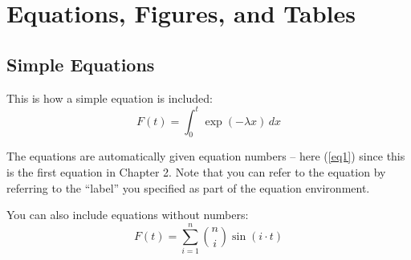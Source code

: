 \chapter[Equations, etc]{Equations, Figures, and Tables}

\section{Simple Equations}
This is how a simple equation is included:
\begin{equation}
F(t)=\int_0^t \exp(-\lambda x)\,dx
\label{eq1}
\end{equation}

The equations are automatically given equation numbers -- here (\ref{eq1}) since this is the first equation in Chapter 2. Note that you can refer to the equation by referring to the ``label'' you specified as part of the equation environment.

You can also include equations without numbers:
\begin{equation*}
F(t)=\sum_{i=1}^n \binom{n}{i}\sin(i\cdot t)
\end{equation*}




